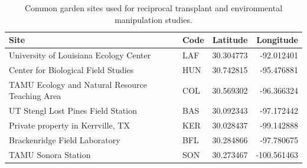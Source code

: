 \documentclass[12pt]{article}\usepackage[]{graphicx}\usepackage[dvipsnames]{xcolor}
\begin{document}
{\begin{table}[ht]
	\centering
	\caption{Summary of endophyte removal treatments by species and population. For each population, N indicates the number of plants that were tested for endophyte status and \%E+ indicates the proportion that tested positive. Treatment refers to endophyte removal treatment applied to the seed lineage: Control (no treatment) or Heat (5 days in a drying over at 60\degree C for \emph{E. virginicus} and \emph{P. autumnalis}, 12 minutes in a 60\degree C water bath for \emph{A. hyemalis}). For all populations except SFAEF and PALM, heat-treated seed lineages were one or more generations removed from the treatment. For those two populations, plants from heat-treated seeds were used directly in the experiment. }
	\label{tab:heat_treatment}
	
\end{table}
\clearpage

\begin{table}[ht]
\caption[Geographic coordinates of common garden sites for study species]{Common garden sites used for reciprocal transplant and environmental manipulation studies.}
\label{tab:exp_sites}
\begin{tabular}{llrr}
\hline
\textbf{Site} & \textbf{Code} & \textbf{Latitude} & \textbf{Longitude} \\
\hline
University of Louisiana Ecology Center & LAF & 30.304773 & -92.012401 \\
Center for Biological Field Studies & HUN & 30.742815 & -95.476881 \\
TAMU Ecology and Natural Resource Teaching Area & COL & 30.569302 & -96.366324 \\
UT Stengl Lost Pines Field Station & BAS & 30.092343 & -97.172442 \\
Private property in Kerrville, TX & KER & 30.028437 & -99.142888 \\
Brackenridge Field Laboratory & BFL & 30.284866 & -97.780675 \\
TAMU Sonora Station & SON & 30.273467 & -100.561463 \\
\hline
\end{tabular}
\end{table}
\clearpage 

}
\end{document}
